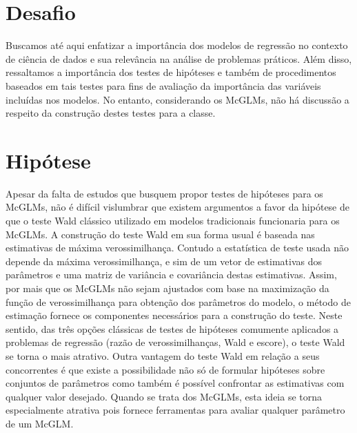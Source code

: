 \section{Desafio}

Buscamos até aqui enfatizar a importância dos modelos de regressão no contexto de ciência de dados e sua relevância na análise de problemas práticos. Além disso, ressaltamos a importância dos testes de hipóteses e também de procedimentos baseados em tais testes para fins de avaliação da importância das variáveis incluídas nos modelos. No entanto, considerando os McGLMs, não há discussão a respeito da construção destes testes para a classe.


\section{Hipótese}

Apesar da falta de estudos que busquem propor testes de hipóteses para os McGLMs, não é difícil vislumbrar que existem argumentos a favor da hipótese de que o teste Wald clássico utilizado em modelos tradicionais funcionaria para os McGLMs. A construção do teste Wald em sua forma usual é baseada nas estimativas de máxima verossimilhança. Contudo a estatística de teste usada não depende da máxima verossimilhança, e sim de um vetor de estimativas dos parâmetros e uma matriz de variância e covariância destas estimativas. Assim, por mais que os McGLMs não sejam ajustados com base na maximização da função de verossimilhança para obtenção dos parâmetros do modelo, o método de estimação fornece os componentes necessários para a construção do teste. Neste sentido, das três opções clássicas de testes de hipóteses comumente aplicados a problemas de regressão (razão de verossimilhanças, Wald e escore), o teste Wald se torna o mais atrativo. Outra vantagem do teste Wald em relação a seus concorrentes é que existe a possibilidade não só de formular hipóteses sobre conjuntos de parâmetros como também é possível confrontar as estimativas com qualquer valor desejado. Quando se trata dos McGLMs, esta ideia se torna especialmente atrativa pois fornece ferramentas para avaliar qualquer parâmetro de um McGLM. 

